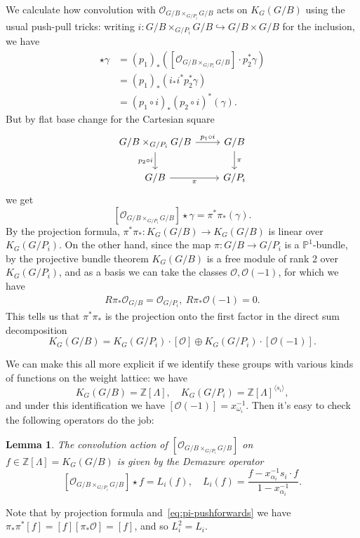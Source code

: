 \documentclass[11pt]{amsart}
\newtheorem{lemma}[dummy]{Lemma}
\theoremstyle{definition}
\newcommand{\bP}{\mathbb{P}}
\newcommand{\bZ}{\mathbb{Z}}
\newcommand{\Oc}{\mathcal{O}}
\numberwithin{equation}{subsection}
\numberwithin{figure}{subsection}
\newcommand{\pt}{\mathrm{pt}}
\begin{document}
We calculate how convolution with $\mathcal{O}_{G/B\times_{G/P_i} G/B}$ acts on $K_G(G/B)$ using the usual push-pull tricks: writing $i:G/B\times_{G/P_i} G/B\hookrightarrow G/B\times G/B$ for the inclusion, we have
\begin{align*}
[\Oc_{G/B\times_{G/P_i} G/B}]\star \gamma &=(p_1)_*\left([\Oc_{G/B\times_{G/P_i} G/B}]\cdot p_2^*\gamma\right)\\
&=(p_1)_*\left(i_*i^*p_2^*\gamma\right)\\
&=(p_1\circ i)_*(p_2\circ i)^*(\gamma).
\end{align*}
But by flat base change for the Cartesian square
$$
\begin{tikzcd}
G/B\times_{G/P_i}G/B \arrow{r}{p_1\circ i} \arrow[swap]{d}{p_2\circ i}& G/B \arrow{d}{\pi} \\
G/B \arrow[swap]{r}{\pi} & G/P_i
\end{tikzcd}
$$
we get
$$
[\Oc_{G/B\times_{G/P_i} G/B}]\star \gamma = \pi^*\pi_*(\gamma).
$$
By the projection formula, $\pi^*\pi_*:K_G(G/B)\rightarrow K_G(G/B)$ is linear over $K_G(G/P_i)$.
On the other hand, since the map $\pi:G/B\rightarrow G/P_i$ is a $\bP^1$-bundle,
by the projective bundle theorem $K_G(G/B)$ is a free module of rank 2 over $K_G(G/P_i)$, and as a basis we can take the classes $\Oc,\Oc(-1)$, for which we have 
\begin{align}
\label{eq:pi-pushforwards}
R\pi_*\Oc_{G/B}=\Oc_{G/P_i},~R\pi_*\Oc(-1)=0.
\end{align}
This tells us that $\pi^*\pi_*$ is the projection onto the first factor in the direct sum decomposition
$$
K_G(G/B)= K_G(G/P_i)\cdot [\Oc]\oplus K_G(G/P_i)\cdot [\Oc(-1)].
$$




We can make this all more explicit if we identify these groups with various kinds of functions on the weight lattice: we have
$$
K_G(G/B)=\bZ[\Lambda], \quad K_{G}(G/P_i)=\bZ[\Lambda]^{\langle s_i\rangle},
$$
and under this identification we have $[\Oc(-1)]=x_{\omega_i}^{-1}$. Then it's easy to check the following operators do the job:
\begin{lemma}
The convolution action of $[\Oc_{G/B\times_{G/P_i} G/B}]$ on $f\in \bZ[\Lambda]=K_G(G/B)$ is given by the \emph{Demazure operator}
$$
[\Oc_{G/B\times_{G/P_i} G/B}]\star f=L_i(f),\quad L_i(f) = \frac{f - x_{\alpha_i}^{-1}s_i\cdot f}{1-x_{\alpha_i}^{-1}}.
$$
\end{lemma}
Note that by projection formula and~\eqref{eq:pi-pushforwards} we have $\pi_*\pi^*[f]=[f][\pi_*\Oc]=[f]$, and so $L_i^2=L_i$.
\end{document}
